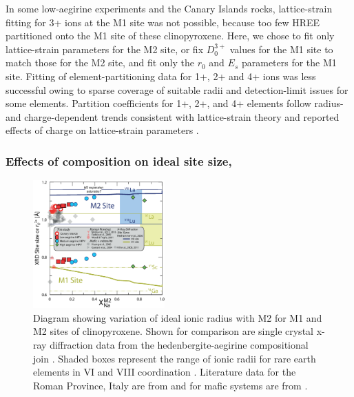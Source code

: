 \documentclass[review,authoryear,12pt]{elsarticle}
\begin{document}
In some low-aegirine experiments and the Canary Islands rocks, lattice-strain fitting for 3+ ions at the M1 site was not possible, because too few HREE partitioned onto the M1 site of these clinopyroxene. Here, we chose to fit only lattice-strain parameters for the M2 site, or fix $D_0^{3+}$ values for the M1 site to match those for the M2 site, and fit only the $r_0$ and $E_{s}$ parameters for the M1 site. Fitting of element-partitioning data for 1+, 2+ and 4+ ions was less successful owing to sparse coverage of suitable radii and detection-limit issues for some elements. Partition coefficients for 1+, 2+, and 4+ elements follow radius- and charge-dependent trends consistent with lattice-strain theory and reported effects of charge on lattice-strain parameters \citep[Fig. \ref{8_Latticestrain3}b, e.g.,][]{Hazen1979, Law2000, Adam2006}.


\subsubsection{Effects of composition on ideal site size, }

        \begin{figure}[bt]
        \begin{center}
        \includegraphics[width=0.45\textwidth]{9_Px_XRD_Jun2017-01.eps}
        \caption[Variation of ideal ionic radius $r_0^{3+}$ with M2 for M1 and M2 sites of clinopyroxene]{Diagram showing variation of ideal ionic radius  with M2 for M1 and M2 sites of clinopyroxene. Shown for comparison are single crystal x-ray diffraction data from the hedenbergite-aegirine compositional join \citep[heavy solid lines, from][]{Redhammer2006}. Shaded boxes represent the range of ionic radii for rare earth elements in VI and VIII coordination \citep{Shannon1976}. Literature data for the Roman Province, Italy are from \citet{Fedele2009, Mollo2013, Mollo2016, Wood2001cpx} and for mafic systems are from \citet{Hill2000, Hill2011, Gaetani2004, Huang2006}.}
        \label{9_Px_XRD}
        \end{center}
        \end{figure}
        
\end{document}
